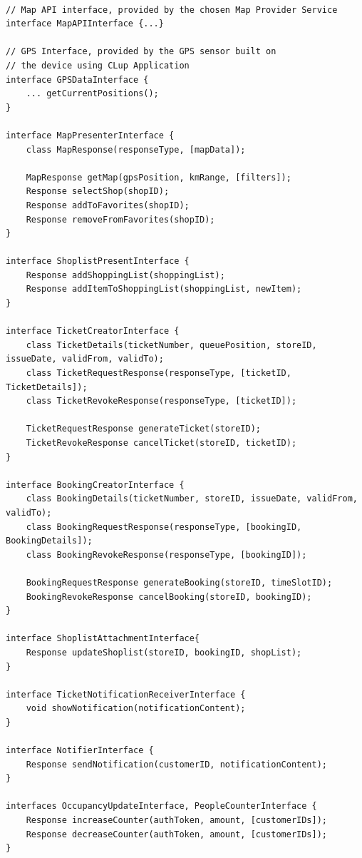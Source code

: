 \begin{lstlisting}

// Map API interface, provided by the chosen Map Provider Service
interface MapAPIInterface {...}

// GPS Interface, provided by the GPS sensor built on 
// the device using CLup Application
interface GPSDataInterface {
    ... getCurrentPositions();
}

interface MapPresenterInterface {
    class MapResponse(responseType, [mapData]);

    MapResponse getMap(gpsPosition, kmRange, [filters]);
    Response selectShop(shopID);
    Response addToFavorites(shopID);
    Response removeFromFavorites(shopID);
}

interface ShoplistPresentInterface {
    Response addShoppingList(shoppingList);
    Response addItemToShoppingList(shoppingList, newItem);
}

interface TicketCreatorInterface {
    class TicketDetails(ticketNumber, queuePosition, storeID, issueDate, validFrom, validTo);
    class TicketRequestResponse(responseType, [ticketID, TicketDetails]);
    class TicketRevokeResponse(responseType, [ticketID]);

    TicketRequestResponse generateTicket(storeID);
    TicketRevokeResponse cancelTicket(storeID, ticketID);
}

interface BookingCreatorInterface {
    class BookingDetails(ticketNumber, storeID, issueDate, validFrom, validTo);
    class BookingRequestResponse(responseType, [bookingID, BookingDetails]);
    class BookingRevokeResponse(responseType, [bookingID]);

    BookingRequestResponse generateBooking(storeID, timeSlotID);
    BookingRevokeResponse cancelBooking(storeID, bookingID);
}

interface ShoplistAttachmentInterface{
    Response updateShoplist(storeID, bookingID, shopList);
}

interface TicketNotificationReceiverInterface {
    void showNotification(notificationContent);
}

interface NotifierInterface {
    Response sendNotification(customerID, notificationContent);
}

interfaces OccupancyUpdateInterface, PeopleCounterInterface {
    Response increaseCounter(authToken, amount, [customerIDs]);
    Response decreaseCounter(authToken, amount, [customerIDs]);
}

\end{lstlisting}
\clearpage

